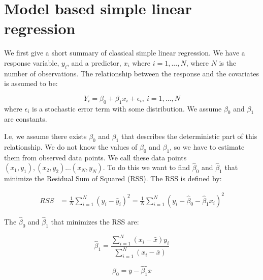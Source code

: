 \documentclass{article}
\begin{document}

\section{Model based simple linear regression} \label{sec:modLinReg}

We first give a short summary of classical simple linear regression. We have a response variable, \(y_i\), and a predictor,
\(x_i\) where \(i = 1, ..., N\), where \(N\) is the number of observations. The
relationship between the response and the covariates is assumed to be:

\begin{equation*}
Y_i = \beta_0 + \beta_1 x_i + \epsilon_i,\ i = 1, \dots, N
\end{equation*}
where \(\epsilon_i\) is a stochastic error term with some distribution. We
assume \(\beta_0\) and \(\beta_1\) are constants.

I.e, we assume there exists \(\beta_0\) and \(\beta_1\) that describes the
deterministic part of this relationship.
We do not know the values of \(\beta_0\) and \(\beta_1\), so we have to estimate them from observed data points. We call these data points \((x_1, y_1), (x_2, y_2)
... (x_N, y_N)\). To do
this we want to find \(\hat{\beta}_0\) and \(\hat{\beta}_1\) that minimize the
Residual Sum of Squared (RSS). The RSS is defined by:

\begin{align*}
  RSS &= \frac{1}{N} \sum_{i = 1}^N \left( y_i - \hat{y}_i \right)^2 
  = \frac{1}{N} \sum_{i = 1}^N \left( y_i - \hat{\beta}_0 - \hat{\beta}_1 x_i \right)^2
\end{align*}

The \(\hat{\beta}_0\) and \(\hat{\beta}_1\) that minimizes the RSS are:

\begin{equation*}
 \hat{\beta}_1 = \frac{\sum_{i = 1}^N\left( x_i - \bar{x} \right) y_i}{\sum_{i = 1}^N\left( x_i - \bar{x} \right)} 
\end{equation*}

\begin{equation*}
 \hat{\beta}_0 = \bar{y} - \hat{\beta_1}\bar{x} 
\end{equation*}
\end{document}
